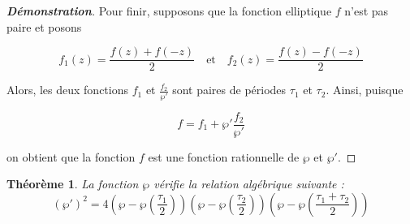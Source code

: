 \documentclass[12pt]{article}
\newtheorem{theorem}{Théorème}
\begin{document}
\begin{proof}[\textbf{Démonstration}]
                    Pour finir, supposons que la fonction elliptique \(f\) n’est pas paire et posons
                    
                    \[
                    f_1(z) = \frac{f(z) + f(-z)}{2} \quad \text{et} \quad f_2(z) = \frac{f(z) - f(-z)}{2}
                    \]
                    
                    Alors, les deux fonctions \(f_1\) et \(\frac{f_2}{\wp'}\) sont paires de périodes \(\tau_1\) et \(\tau_2\). Ainsi, puisque
                    
                    \[
                    f = f_1 + \wp' \frac{f_2}{\wp'}
                    \]
                    
                    on obtient que la fonction \(f\) est une fonction rationnelle de \(\wp\) et \(\wp'\).
                    \end{proof}
                    \begin{theorem}
                        La fonction $\wp$ vérifie la relation algébrique suivante :
                        \[
                        (\wp')^2 = 4 \left( \wp - \wp\left( \frac{\tau_1}{2} \right) \right) \left( \wp - \wp\left( \frac{\tau_2}{2} \right) \right) \left( \wp - \wp\left( \frac{\tau_1 + \tau_2}{2} \right) \right)
                        \]
                        \end{theorem}
                        
\end{document}
